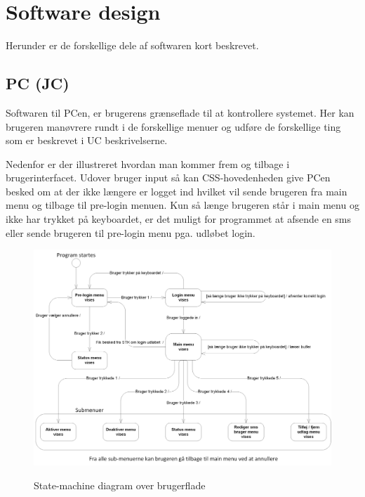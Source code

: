 \clearpage

\section{Software design}

Herunder er de forskellige dele af softwaren kort beskrevet. 

\subsection{PC (JC)}

Softwaren til PCen, er brugerens grænseflade til at kontrollere systemet. Her kan brugeren manøvrere rundt i de forskellige menuer og udføre de forskellige ting som er beskrevet i UC beskrivelserne.

Nedenfor er der illustreret hvordan man kommer frem og tilbage i brugerinterfacet. Udover bruger input så kan CSS-hovedenheden give PCen besked om at der ikke længere er logget ind hvilket vil sende brugeren fra main menu og tilbage til pre-login menuen. Kun så længe brugeren står i main menu og ikke har trykket på keyboardet, er det muligt for programmet at afsende en sms eller sende brugeren til pre-login menu pga. udløbet login.

\begin{figure}[htbp] \centering
{\includegraphics[width=\textwidth]{billeder/uml/state_machine_main}}
\caption{State-machine diagram over brugerflade}
\label{fig:State machine diagram over brugerflade}
\end{figure}



